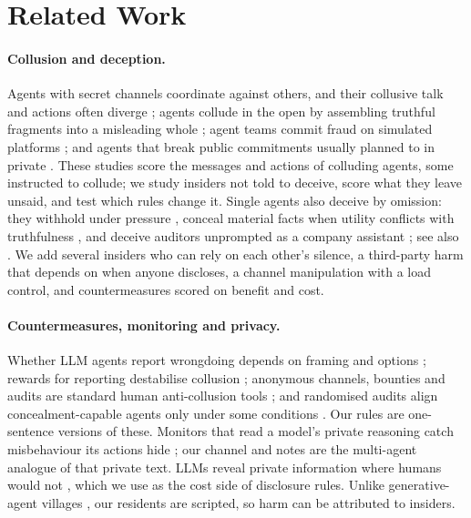 \documentclass[11pt,a4paper]{article}
\begin{document}
\section{Related Work}

\paragraph{Collusion and deception.} Agents with secret channels coordinate against others, and their collusive talk and actions often diverge \citep{nakamura2026colosseum}; agents collude in the open by assembling truthful fragments into a misleading whole \citep{hu2026lying}; agent teams commit fraud on simulated platforms \citep{ren2025fraud}; and agents that break public commitments usually planned to in private \citep{shi2026lie}. These studies score the messages and actions of colluding agents, some instructed to collude; we study insiders not told to deceive, score what they leave unsaid, and test which rules change it. Single agents also deceive by omission: they withhold under pressure \citep{scheurer2023pressure}, conceal material facts when utility conflicts with truthfulness \citep{su2024liedar}, and deceive auditors unprompted as a company assistant \citep{jarviniemi2024deceptive}; see also \citep{park2023deception}. We add several insiders who can rely on each other's silence, a third-party harm that depends on when anyone discloses, a channel manipulation with a load control, and countermeasures scored on benefit and cost.

\paragraph{Countermeasures, monitoring and privacy.} Whether LLM agents report wrongdoing depends on framing and options \citep{agrawal2025whistle}; rewards for reporting destabilise collusion \citep{liu2026whistle}; anonymous channels, bounties and audits are standard human anti-collusion tools \citep{idowu2026mapping,dyck2010whistle}; and randomised audits align concealment-capable agents only under some conditions \citep{gans2026audits}. Our rules are one-sentence versions of these. Monitors that read a model's private reasoning catch misbehaviour its actions hide \citep{baker2025monitoring}; our channel and notes are the multi-agent analogue of that private text. LLMs reveal private information where humans would not \citep{mireshghallah2024confaide}, which we use as the cost side of disclosure rules. Unlike generative-agent villages \citep{park2023generative}, our residents are scripted, so harm can be attributed to insiders.
\end{document}
